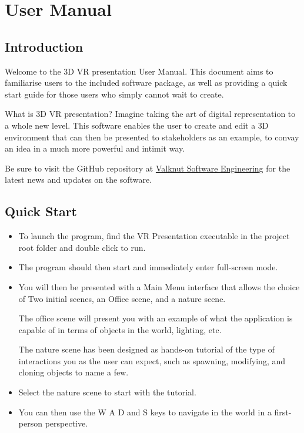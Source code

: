 
\section{User Manual}

	\subsection{Introduction}
	
	Welcome to the 3D VR presentation User Manual.  This document aims to familiarise users to the included software package, as well as providing a quick start guide for those users who simply cannot wait to create.  
	
	What is 3D VR presentation?  Imagine taking the art of digital representation to a whole new level.  This software enables the user to create and edit a 3D environment that can then be presented to stakeholders as an example, to convay an idea in a much more powerful and intimit way.  
	
	Be sure to visit the GitHub repository at 
	\href{https://github.com/Valknut-Software-Engineering/Capstone_Project}{Valknut Software Engineering}
	for the latest news and updates on the software.  
	
	\subsection{Quick Start}
	
	\begin{itemize}
	
		\item To launch the program, find the VR Presentation executable in the project root folder and double click to run.
	
		\item The program should then start and immediately enter full-screen mode.
	
		\item You will then be presented with a Main Menu interface that allows the choice of Two initial scenes, an Office scene, and a nature scene.  

			The office scene will present you with an example of what the application is capable of in terms of objects in the world, lighting, etc.  
	
			The nature scene has been designed as hands-on tutorial of the type of interactions you as the user can expect, such as spawning, modifying, and cloning objects to name a few.  
	
		\item Select the nature scene to start with the tutorial.  
		
		\item You can then use the W A D and S keys to navigate in the world in a first-person perspective.  
	
	\end{itemize}		
	
